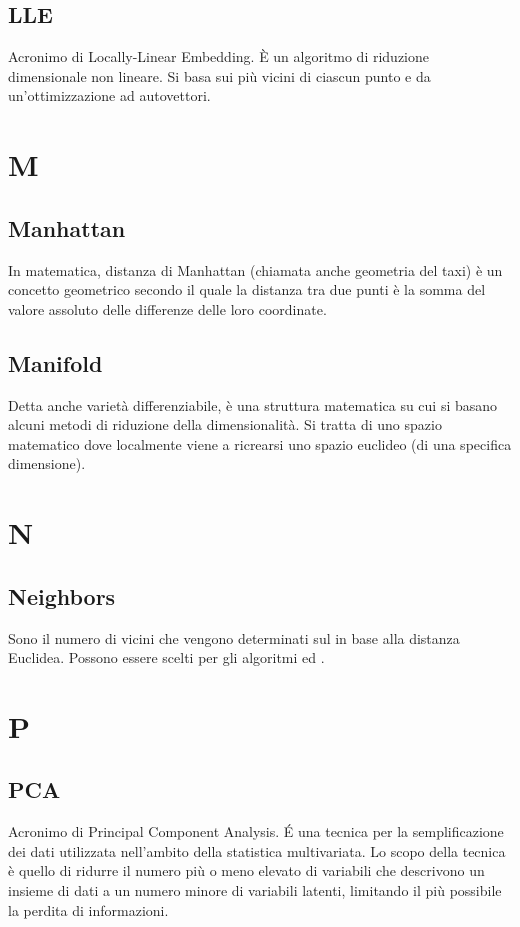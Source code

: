 \subsection*{LLE}
Acronimo di Locally-Linear Embedding. È un algoritmo di riduzione dimensionale non lineare. Si basa sui più vicini  di ciascun punto e da un'ottimizzazione ad autovettori. 

\section*{M}

\subsection*{Manhattan}
In matematica, distanza di Manhattan (chiamata anche geometria del taxi) è un concetto geometrico secondo il quale la distanza tra due punti è la somma del valore assoluto delle differenze delle loro coordinate. 

\subsection*{Manifold}
Detta anche varietà differenziabile, è una struttura matematica su cui si basano alcuni metodi di riduzione della dimensionalità. Si tratta di uno spazio matematico dove localmente viene a ricrearsi uno spazio euclideo (di una specifica dimensione).

\section*{N}

\subsection*{Neighbors}
Sono il numero di vicini che vengono determinati sul  in base alla distanza Euclidea. Possono essere scelti per gli algoritmi  ed .

\section*{P}
\subsection*{PCA}
Acronimo di Principal Component Analysis. \'E una tecnica per la semplificazione dei dati utilizzata nell'ambito della statistica multivariata. Lo scopo della tecnica è quello di ridurre il numero più o meno elevato di variabili che descrivono un insieme di dati a un numero minore di variabili latenti, limitando il più possibile la perdita di informazioni.

